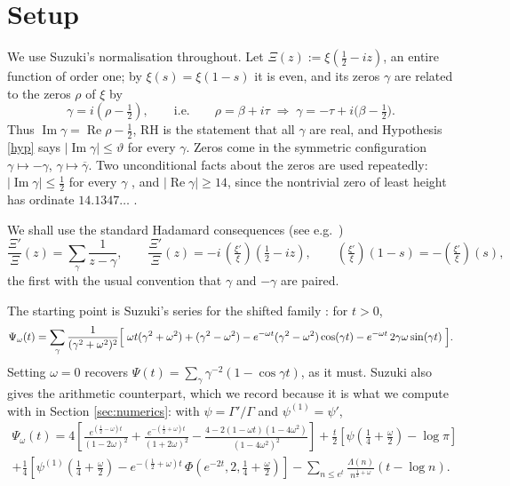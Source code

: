 \documentclass[11pt,reqno]{amsart}
\theoremstyle{plain}
\theoremstyle{definition}
\newcommand{\Rp}{\operatorname{Re}}
\newcommand{\Ip}{\operatorname{Im}}
\newcommand{\lxi}[1]{\left(\tfrac{\xi'}{\xi}\right)\!#1}
\begin{document}
\section{Setup}\label{sec:setup}

We use Suzuki's normalisation throughout. Let $\Xi(z):=\xi(\tfrac12-iz)$, an entire function of
order one; by $\xi(s)=\xi(1-s)$ it is even, and its zeros $\gamma$ are related to the zeros $\rho$
of $\xi$ by
\begin{equation}\label{eq:gammarho}
  \gamma=i\left(\rho-\tfrac12\right),
  \qquad\text{i.e.}\qquad
  \rho=\beta+i\tau \;\Longrightarrow\; \gamma=-\tau+i\bigl(\beta-\tfrac12\bigr).
\end{equation}
Thus $\Ip\gamma=\Rp\rho-\tfrac12$, RH is the statement that all $\gamma$ are real, and
Hypothesis \ref{hyp} says $|\Ip\gamma|\le\vartheta$ for every $\gamma$. Zeros come in the symmetric
configuration $\gamma\mapsto-\gamma$, $\gamma\mapsto\overline{\gamma}$. Two unconditional facts
about the zeros are used repeatedly: $|\Ip\gamma|\le\tfrac12$ for every $\gamma$
\cite[Thm.~2.12]{Titchmarsh}, and $|\Rp\gamma|\ge14$, since the nontrivial zero of least height has
ordinate $14.1347\ldots$ \cite[\S15]{Titchmarsh}.

We shall use the standard Hadamard consequences (see e.g.\ \cite[\S12]{Davenport})
\begin{equation}\label{eq:hadamard}
  \frac{\Xi'}{\Xi}(z)=\sum_\gamma\frac{1}{z-\gamma},
  \qquad
  \frac{\Xi'}{\Xi}(z)=-i\,\lxi{\left(\tfrac12-iz\right)},
  \qquad
  \lxi{(1-s)}=-\lxi{(s)},
\end{equation}
the first with the usual convention that $\gamma$ and $-\gamma$ are paired.

The starting point is Suzuki's series for the shifted family \cite[\S11]{Suzuki2023}: for $t>0$,
\begin{equation}\label{eq:Psiomegaseries}
  \Psi_\omega(t)=\sum_\gamma\frac{1}{(\gamma^{2}+\omega^{2})^{2}}
  \Bigl[\;\omega t(\gamma^{2}+\omega^{2})+(\gamma^{2}-\omega^{2})
   - e^{-\omega t}(\gamma^{2}-\omega^{2})\cos(\gamma t)
   - e^{-\omega t}\,2\gamma\omega\sin(\gamma t)\;\Bigr].
\end{equation}
Setting $\omega=0$ recovers $\Psi(t)=\sum_\gamma\gamma^{-2}(1-\cos\gamma t)$, as it must. Suzuki
also gives the arithmetic counterpart, which we record because it is what we compute with in
Section \ref{sec:numerics}: with $\psi=\Gamma'/\Gamma$ and $\psi^{(1)}=\psi'$,
\begin{multline}\label{eq:Psiomegaprimes}
  \Psi_\omega(t)=
  4\left[\frac{e^{(\frac12-\omega)t}}{(1-2\omega)^{2}}+\frac{e^{-(\frac12+\omega)t}}{(1+2\omega)^{2}}
  -\frac{4-2(1-\omega t)(1-4\omega^{2})}{(1-4\omega^{2})^{2}}\right]
  +\frac t2\left[\psi\!\left(\tfrac14+\tfrac\omega2\right)-\log\pi\right]\\
  +\frac14\left[\psi^{(1)}\!\left(\tfrac14+\tfrac\omega2\right)
   -e^{-(\frac12+\omega)t}\,\Phi\!\left(e^{-2t},2,\tfrac14+\tfrac\omega2\right)\right]
  -\sum_{n\le e^{t}}\frac{\Lambda(n)}{n^{\frac12+\omega}}(t-\log n).
\end{multline}
\end{document}
